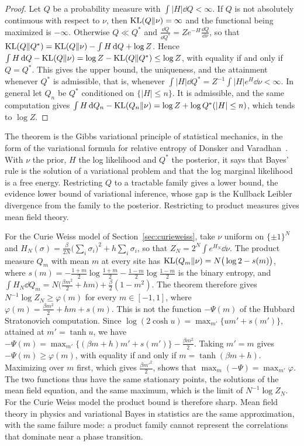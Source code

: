 \begin{proof}
Let $Q$ be a probability measure with $\int|H|\dd Q<\infty$. If $Q$ is not absolutely continuous with respect to $\nu$, then $\mathrm{KL}(Q\|\nu) = \infty$ and the functional being maximized is $-\infty$. Otherwise $Q\ll Q^*$ and $\frac{\dd Q}{\dd Q^*} = Ze^{-H}\frac{\dd Q}{\dd\nu}$, so that $\mathrm{KL}(Q\|Q^*) = \mathrm{KL}(Q\|\nu)-\int H\,\mathrm{d} Q+\log Z$. Hence $\int H\,\mathrm{d} Q-\mathrm{KL}(Q\|\nu) = \log Z-\mathrm{KL}(Q\|Q^*)\leq\log Z$, with equality if and only if $Q = Q^*$. This gives the upper bound, the uniqueness, and the attainment whenever $Q^*$ is admissible, that is, whenever $\int|H|\dd Q^* = Z^{-1}\int|H|e^H\dd\nu<\infty$. In general let $Q_n$ be $Q^*$ conditioned on $\{|H|\leq n\}$. It is admissible, and the same computation gives $\int H\,\mathrm{d} Q_n-\mathrm{KL}(Q_n\|\nu) = \log Z+\log Q^*(|H|\leq n)$, which tends to $\log Z$.
\end{proof}

The theorem is the Gibbs variational principle of statistical mechanics, in the form of the variational formula for relative entropy of Donsker and Varadhan~\cite{donsker1975}. With $\nu$ the prior, $H$ the log likelihood and $Q^*$ the posterior, it says that Bayes' rule is the solution of a variational problem and that the log marginal likelihood is a free energy. Restricting $Q$ to a tractable family gives a lower bound, the evidence lower bound of variational inference, whose gap is the Kullback Leibler divergence from the family to the posterior. Restricting to product measures gives mean field theory.

For the Curie Weiss model of Section~\ref{sec:curieweiss}, take $\nu$ uniform on $\{\pm1\}^N$ and $H_N(\sigma) = \frac{\beta}{2N}\big(\sum_i\sigma_i\big)^2+h\sum_i\sigma_i$, so that $Z_N = 2^N\int e^{H_N}\dd\nu$. The product measure $Q_m$ with mean $m$ at every site has $\mathrm{KL}(Q_m\|\nu) = N\big(\log2-s(m)\big)$, where $s(m) = -\frac{1+m}{2}\log\frac{1+m}{2}-\frac{1-m}{2}\log\frac{1-m}{2}$ is the binary entropy, and $\int H_N\dd Q_m = N\big(\frac{\beta m^2}{2}+hm\big)+\frac\beta2(1-m^2)$. The theorem therefore gives $N^{-1}\log Z_N\geq\varphi(m)$ for every $m\in[-1,1]$, where $\varphi(m) = \frac{\beta m^2}{2}+hm+s(m)$. This is not the function $-\Psi(m)$ of the Hubbard Stratonovich computation. Since $\log(2\cosh u) = \max_{m'}\{um'+s(m')\}$, attained at $m' = \tanh u$, we have $-\Psi(m) = \max_{m'}\{(\beta m+h)m'+s(m')\}-\frac{\beta m^2}{2}$. Taking $m' = m$ gives $-\Psi(m)\geq\varphi(m)$, with equality if and only if $m = \tanh(\beta m+h)$. Maximizing over $m$ first, which gives $\frac{\beta m'^2}{2}$, shows that $\max_m(-\Psi) = \max_{m'}\varphi$. The two functions thus have the same stationary points, the solutions of the mean field equation, and the same maximum, which is the limit of $N^{-1}\log Z_N$. For the Curie Weiss model the product bound is therefore sharp. Mean field theory in physics and variational Bayes in statistics are the same approximation, with the same failure mode: a product family cannot represent the correlations that dominate near a phase transition.

